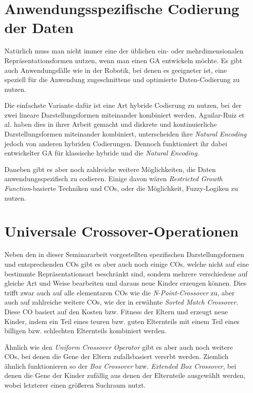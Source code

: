\section{Anwendungsspezifische Codierung der Daten}
\label{sec:AnwSpezCod}

	Natürlich muss man nicht immer eine der üblichen ein- oder mehrdimensionalen Repräsentationsformen nutzen, wenn man einen GA entwickeln möchte. Es gibt auch Anwendungsfälle wie \zB in der Robotik, \cite{GABook} bei denen es geeigneter ist, eine speziell für die Anwendung zugeschnittene und optimierte Daten-Codierung zu nutzen.
	
	Die einfachste Variante dafür ist eine Art hybride Codierung zu nutzen, bei der zwei lineare Darstellungsformen miteinander kombiniert werden. Aguilar-Ruiz et al. haben dies in ihrer Arbeit \cite{NaturalCoding} gemacht und diskrete und kontinuierliche Darstellungsformen miteinander kombiniert, unterscheiden ihre \textit{Natural Encoding} jedoch von anderen hybriden Codierungen. Dennoch funktioniert ihr dabei entwickelter GA für klassische hybride und die \textit{Natural Encoding}.
	
	Daneben gibt es aber noch zahlreiche weitere Möglichkeiten, die Daten anwendungsspezifisch zu codieren. Einige davon wären \zB \textit{Restricted Growth Function}-basierte Techniken und COs, \cite{RestrictedGrowthFunction} oder die Mög\-lich\-keit, Fuzzy-Logiken zu nutzen. \cite{FuzzyEncoding}

\section{Universale Crossover-Operationen}
\label{sec:UnivOp}

	Neben den in dieser Seminararbeit vorgestellten spezifischen Darstellungsformen und entsprechenden COs gibt es aber auch noch einige COs, welche nicht auf eine bestimmte Repräsentationsart beschränkt sind, sondern mehrere verschiedene auf gleiche Art und Weise bearbeiten und daraus neue Kinder erzeugen können. Dies trifft zwar auch auf alle elementaren COs wie die \textit{N-Point-Crossover} zu, aber auch auf zahlreiche weitere COs, wie \zB der in \cite{COforPermutations} erwähnte \textit{Sorted Match Crossover}. Diese CO basiert auf den Kosten bzw. Fitness der Eltern und erzeugt neue Kinder, indem ein Teil eines teuren bzw. guten Elternteils mit einem Teil eines billigen bzw. schlechten Elternteils kombiniert werden.
	
	Ähnlich wie den \textit{Uniform Crossover Operator} gibt es aber auch noch weitere COs, bei denen die Gene der Eltern zufallsbasiert vererbt werden. Ziemlich ähnlich funktionieren so \zB der \textit{Box Crossover} bzw. \textit{Extended Box Crossover}, bei denen die Gene der Kinder zufällig aus denen der Elternteile ausgewählt werden, wobei letzterer einen größeren Suchraum nutzt. \cite{BoxCrossover}
	
